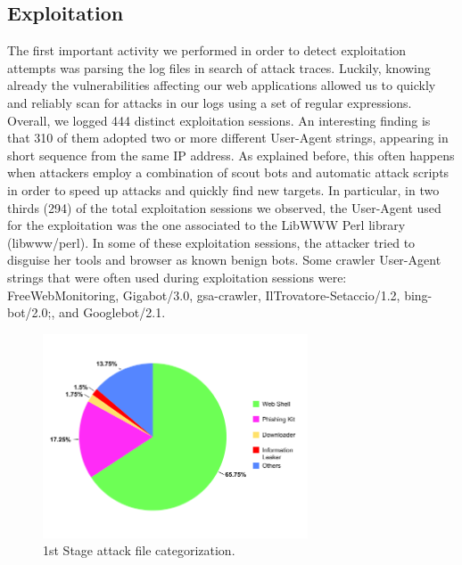 \subsection{Exploitation}

The first important activity we performed in order to detect exploitation attempts was parsing the log files in search of attack traces. Luckily, knowing already the vulnerabilities affecting our web applications allowed us to quickly and reliably scan for attacks in our logs using a set of regular expressions.
Overall, we logged 444 distinct exploitation sessions. An interesting finding is that 310 of them adopted two or more different User-Agent strings, appearing in short sequence from the same IP address. As explained before, this often happens when attackers employ a combination of scout bots and automatic attack scripts in order to speed up attacks and quickly find new targets. In particular, in two thirds (294) of the total exploitation sessions we observed, the User-Agent used for the exploitation was the one associated to the LibWWW Perl library (libwww/perl).
In some of these exploitation sessions, the attacker tried to disguise her tools and browser as known benign bots. Some crawler User-Agent strings that were often used during exploitation sessions were: FreeWebMonitoring, Gigabot/3.0, gsa-crawler, IlTrovatore-Setaccio/1.2, bing- bot/2.0;, and Googlebot/2.1.

\begin{figure}[tbh]
\centerline{\includegraphics[width=0.7\textwidth]{Images/1stStageAttack.png}}
\caption{1st Stage attack file categorization.\label{fig:1stStageAttack}}
\end{figure}


